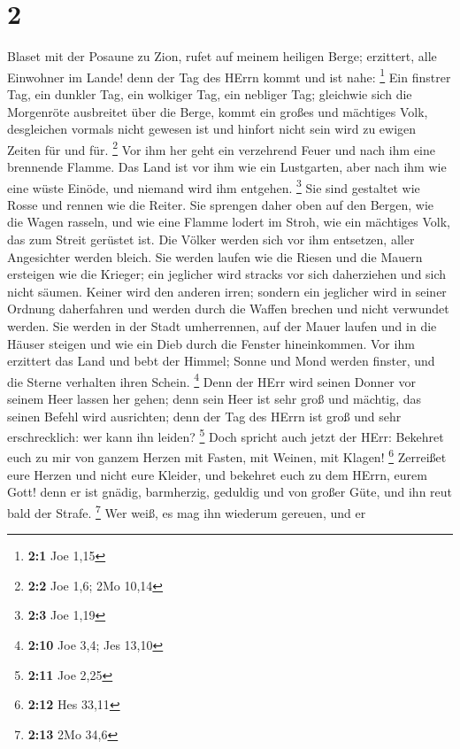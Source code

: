 \hypertarget{section-1}{%
\section{2}\label{section-1}}

 Blaset mit der Posaune zu Zion, rufet auf meinem heiligen
Berge; erzittert, alle Einwohner im Lande! denn der Tag des HErrn kommt
und ist nahe: \footnote{\textbf{2:1} Joe 1,15}  Ein finstrer
Tag, ein dunkler Tag, ein wolkiger Tag, ein nebliger Tag; gleichwie sich
die Morgenröte ausbreitet über die Berge, kommt ein großes und mächtiges
Volk, desgleichen vormals nicht gewesen ist und hinfort nicht sein wird
zu ewigen Zeiten für und für. \footnote{\textbf{2:2} Joe 1,6; 2Mo 10,14}
 Vor ihm her geht ein verzehrend Feuer und nach ihm eine
brennende Flamme. Das Land ist vor ihm wie ein Lustgarten, aber nach ihm
wie eine wüste Einöde, und niemand wird ihm entgehen. \footnote{\textbf{2:3}
  Joe 1,19}  Sie sind gestaltet wie Rosse und rennen wie die
Reiter.  Sie sprengen daher oben auf den Bergen, wie die
Wagen rasseln, und wie eine Flamme lodert im Stroh, wie ein mächtiges
Volk, das zum Streit gerüstet ist.  Die Völker werden sich
vor ihm entsetzen, aller Angesichter werden bleich.  Sie
werden laufen wie die Riesen und die Mauern ersteigen wie die Krieger;
ein jeglicher wird stracks vor sich daherziehen und sich nicht säumen.
 Keiner wird den anderen irren; sondern ein jeglicher wird
in seiner Ordnung daherfahren und werden durch die Waffen brechen und
nicht verwundet werden.  Sie werden in der Stadt
umherrennen, auf der Mauer laufen und in die Häuser steigen und wie ein
Dieb durch die Fenster hineinkommen.  Vor ihm erzittert das
Land und bebt der Himmel; Sonne und Mond werden finster, und die Sterne
verhalten ihren Schein. \footnote{\textbf{2:10} Joe 3,4; Jes 13,10}
 Denn der HErr wird seinen Donner vor seinem Heer lassen
her gehen; denn sein Heer ist sehr groß und mächtig, das seinen Befehl
wird ausrichten; denn der Tag des HErrn ist groß und sehr erschrecklich:
wer kann ihn leiden? \footnote{\textbf{2:11} Joe 2,25} 
Doch spricht auch jetzt der HErr: Bekehret euch zu mir von ganzem Herzen
mit Fasten, mit Weinen, mit Klagen! \footnote{\textbf{2:12} Hes 33,11}
 Zerreißet eure Herzen und nicht eure Kleider, und bekehret
euch zu dem HErrn, eurem Gott! denn er ist gnädig, barmherzig, geduldig
und von großer Güte, und ihn reut bald der Strafe. \footnote{\textbf{2:13}
  2Mo 34,6}  Wer weiß, es mag ihn wiederum gereuen, und er
